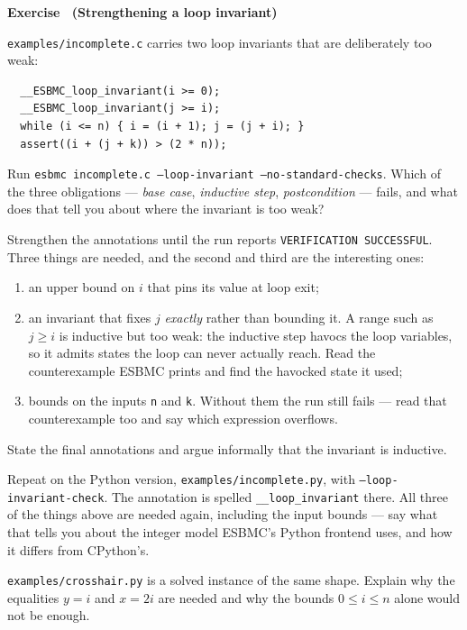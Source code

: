 \documentclass[11pt,a4paper]{article}
\newcommand{\esbmc}{ESBMC}
\newcommand{\flag}[1]{\texttt{\small #1}}
\newcommand{\file}[1]{\texttt{\small #1}}
\newcounter{exc}
\renewcommand{\theexc}{\arabic{exc}}
\newenvironment{exercise}[2][]
  {\stepcounter{exc}\ifx\relax#1\relax\else\excref{#1}\fi%
   \medskip\noindent\textbf{Exercise \theexc\ (#2)}\par\nopagebreak\smallskip}
  {\par\medskip}
\begin{document}
\begin{exercise}{Strengthening a loop invariant}
\file{examples/incomplete.c} carries two loop invariants that are deliberately
too weak:

\begin{lstlisting}
  __ESBMC_loop_invariant(i >= 0);
  __ESBMC_loop_invariant(j >= i);
  while (i <= n) { i = (i + 1); j = (j + i); }
  assert((i + (j + k)) > (2 * n));
\end{lstlisting}

\begin{parts}
  \item Run \texttt{esbmc incomplete.c --loop-invariant --no-standard-checks}.
        Which of the three obligations --- \emph{base case}, \emph{inductive
        step}, \emph{postcondition} --- fails, and what does that tell you about
        where the invariant is too weak?
  \item Strengthen the annotations until the run reports
        \texttt{VERIFICATION SUCCESSFUL}. Three things are needed, and the
        second and third are the interesting ones:
        \begin{enumerate}[label=\roman*.,leftmargin=2.2em,topsep=2pt]
          \item an upper bound on $i$ that pins its value at loop exit;
          \item an invariant that fixes $j$ \emph{exactly} rather than bounding
                it. A range such as $j \ge i$ is inductive but too weak: the
                inductive step havocs the loop variables, so it admits states
                the loop can never actually reach. Read the counterexample
                \esbmc{} prints and find the havocked state it used;
          \item bounds on the inputs \texttt{n} and \texttt{k}. Without them the
                run still fails --- read that counterexample too and say which
                expression overflows.
        \end{enumerate}
        State the final annotations and argue informally that the invariant is
        inductive.
  \item Repeat on the Python version, \file{examples/incomplete.py}, with
        \flag{--loop-invariant-check}. The annotation is spelled
        \flag{\_\_loop\_invariant} there. All three of the things above are
        needed again, including the input bounds --- say what that tells you
        about the integer model \esbmc{}'s Python frontend uses, and how it
        differs from CPython's.
  \item \file{examples/crosshair.py} is a solved instance of the same shape.
        Explain why the equalities $y = i$ and $x = 2i$ are needed and why the
        bounds $0 \le i \le n$ alone would not be enough.
\end{parts}
\end{exercise}
\end{document}

